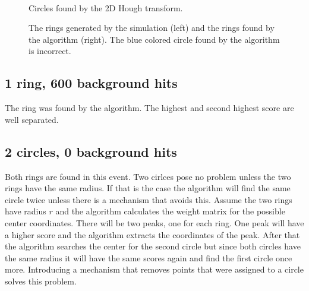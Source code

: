\documentclass[11pt]{scrreprt}
\begin{document}
\begin{figure}[htp]
        \centering
        ~ %
        ~ %
              
        \caption{Circles found by the 2D Hough transform.}\label{fig:2D_HT_results1}

        \caption{The rings generated by the simulation (left) and the rings found by the algorithm (right). The blue colored circle found by the algorithm is incorrect.}
        \label{fig:2d_6c_200_bg2}
\end{figure}

\subsection{1 ring, 600 background hits} %
\label{sub:1_ring_600_background_hits}
The ring was found by the algorithm. The highest and second highest score are well separated. 

\subsection{2 circles, 0 background hits} %
\label{sub:2d_hough_transform_2_circles_0_background}
Both rings are found in this event. Two cirlces pose no problem unless the two rings have the same radius. If that is the case the algorithm will find the same circle twice unless there is a mechanism that avoids this. Assume the two rings have radius $r$ and the algorithm calculates the weight matrix for the possible center coordinates. There will be two peaks, one for each ring. One peak will have a higher score and the algorithm extracts the coordinates of the peak. After that the algorithm searches the center for the second circle but since both circles have the same radius it will have the same scores again and find the first circle once more. Introducing a mechanism that removes points that were assigned to a circle solves this problem.
\end{document}
